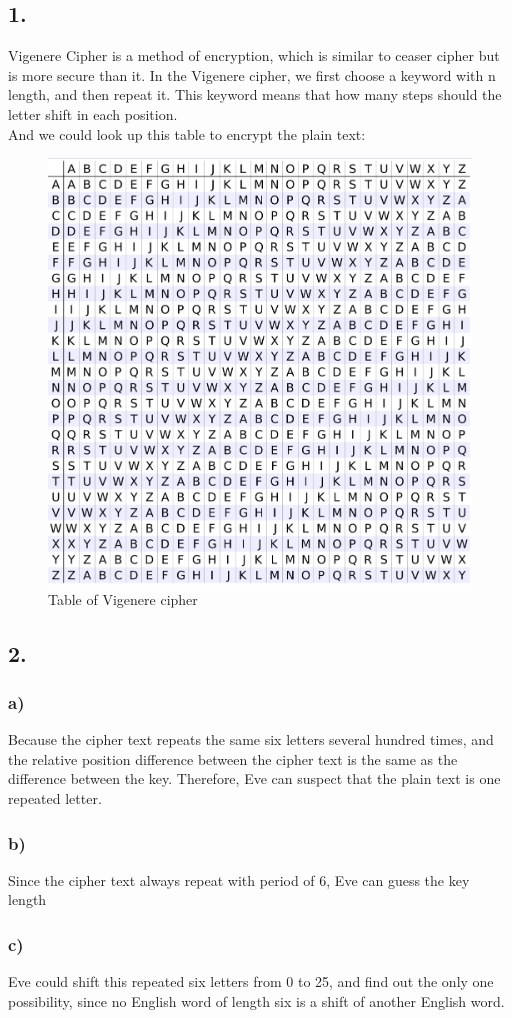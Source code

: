 \documentclass[a4paper,12pt]{journal}
\begin{document}
\subsection*{1.}
Vigenere Cipher is a method of encryption, which is similar to ceaser cipher but is more secure than it. In the Vigenere cipher, we first choose a keyword with n length, and then repeat it. This keyword means that how many steps should the letter shift in each position. \\
And we could look up this table to encrypt the plain text:
\begin{figure}[ht]
\centering
\includegraphics[scale=0.5]{1.png}
\caption{Table of Vigenere cipher}
\end{figure}
\subsection*{2. }
\subsubsection*{a)}
Because the cipher text repeats the same six letters several hundred times, and the relative position difference between the cipher text is the same as the difference between the key. Therefore, Eve can suspect that the plain text is one repeated letter.
\subsubsection*{b)}
Since the cipher text always repeat with period of 6, Eve can guess the key length
\subsubsection*{c)}
Eve could shift this repeated six letters from 0 to 25, and find out the only one possibility, since no English word of length six is a shift of another English word.
\end{document}
